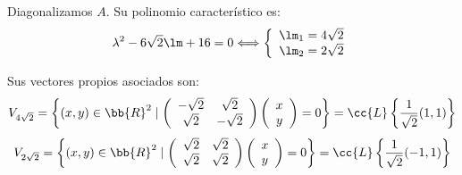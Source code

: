 \begin{ejercicio}
\begin{enumerate}
        Diagonalizamos $A$. Su polinomio característico es:
        \begin{equation*}
            \lambda^2 -6\sqrt{2}\lm +16 = 0 \Longleftrightarrow \left\{\begin{array}{l}
                \lm_1 = 4\sqrt{2}\\
                \lm_2 = 2\sqrt{2}
            \end{array}\right.
        \end{equation*}

        Sus vectores propios asociados son:
        \begin{equation*}
            V_{4\sqrt{2}} = \left\{(x,y)\in \bb{R}^2 \mid \left(\begin{array}{cc}
                -\sqrt{2} & \sqrt{2} \\
                \sqrt{2} & -\sqrt{2}\\ 
            \end{array}\right)\left(\begin{array}{c}
                x\\y
            \end{array}\right)=0 \right\} = \cc{L}\left\{\frac{1}{\sqrt{2}}(1,1)\right\}
        \end{equation*}
        \begin{equation*}
            V_{2\sqrt{2}} = \left\{(x,y)\in \bb{R}^2 \mid \left(\begin{array}{cc}
                \sqrt{2} & \sqrt{2}\\
                \sqrt{2} & \sqrt{2}
            \end{array}\right)\left(\begin{array}{c}
                x\\y
            \end{array}\right)=0 \right\} = \cc{L}\left\{\frac{1}{\sqrt{2}}(-1,1)\right\}
        \end{equation*}


\end{enumerate}
\end{ejercicio}
